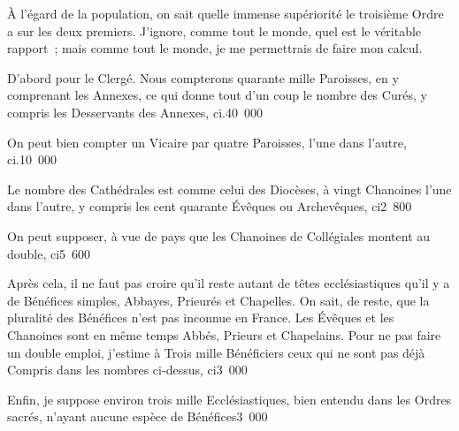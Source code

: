 \documentclass[french,twoside]{book} %
\begin{document}
À l’égard de la population, on sait quelle immense supériorité le troisième Ordre a sur les deux premiers. J’ignore, comme tout le monde, quel est le véritable rapport ; mais comme tout le monde, je me permettrais de faire mon calcul.\par
D’abord pour le Clergé. Nous compterons quarante mille Paroisses, en y comprenant les Annexes, ce qui donne tout d’un coup le nombre des Curés, y compris les Desservants des Annexes, ci.\hspace{1em}\hspace{1em}\hspace{1em}\hspace{1em}\hspace{1em}\hspace{1em}\hspace{1em}\hspace{1em}\hspace{1em}\hspace{1em}40 000\par
On peut bien compter un Vicaire par quatre Paroisses, l’une dans l’autre, ci.\hspace{1em}10 000\par
Le nombre des Cathédrales est comme celui des Diocèses, à vingt Chanoines l’une dans l’autre, y compris les cent quarante Évêques ou Archevêques, ci\hspace{1em}\hspace{1em}\hspace{1em}2 800\par
On peut supposer, à vue de pays que les Chanoines de Collégiales montent au double, ci\hspace{1em}\hspace{1em}\hspace{1em}5 600\par
Après cela, il ne faut pas croire qu’il reste autant de têtes ecclésiastiques qu’il y a de Bénéfices simples, Abbayes, Prieurés et Chapelles. On sait, de reste, que la pluralité des Bénéfices n’est pas inconnue en France. Les Évêques et les Chanoines sont en même temps Abbés, Prieurs et Chapelains. Pour ne pas faire un double emploi, j’estime à Trois mille Bénéficiers ceux qui ne sont pas déjà Compris dans les nombres ci-dessus, ci\hspace{1em}3 000\par
Enfin, je suppose environ trois mille Ecclésiastiques, bien entendu dans les Ordres sacrés, n’ayant aucune espèce de Bénéfices\hspace{1em}\hspace{1em}\hspace{1em}3 000\par
\end{document}
